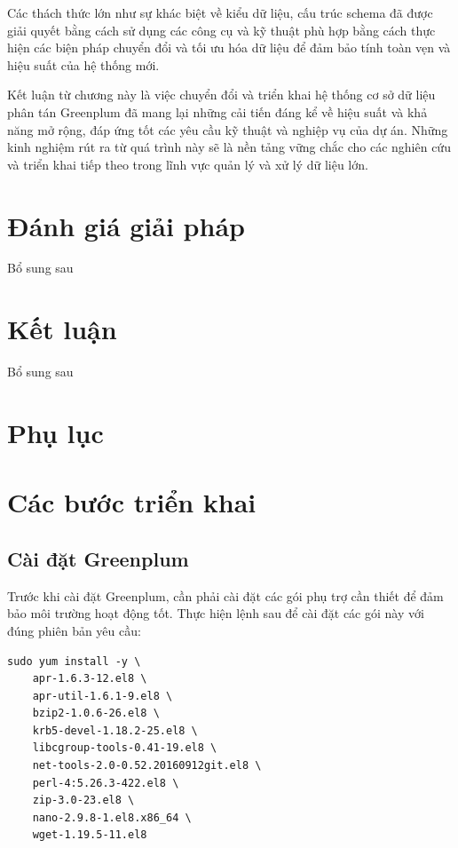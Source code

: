 \documentclass[14pt]{article}
\begin{document}
Các thách thức lớn như sự khác biệt về kiểu dữ liệu, cấu trúc schema đã được giải quyết bằng cách sử dụng các công cụ và kỹ thuật phù hợp bằng cách thực hiện các biện pháp chuyển đổi và tối ưu hóa dữ liệu để đảm bảo tính toàn vẹn và hiệu suất của hệ thống mới.

Kết luận từ chương này là việc chuyển đổi và triển khai hệ thống cơ sở dữ liệu phân tán Greenplum đã mang lại những cải tiến đáng kể về hiệu suất và khả năng mở rộng, đáp ứng tốt các yêu cầu kỹ thuật và nghiệp vụ của dự án. Những kinh nghiệm rút ra từ quá trình này sẽ là nền tảng vững chắc cho các nghiên cứu và triển khai tiếp theo trong lĩnh vực quản lý và xử lý dữ liệu lớn.





\section{Đánh giá giải pháp}
Bổ sung sau

\section{Kết luận}
Bổ sung sau

\section{Phụ lục}
\appendix

\section{Các bước triển khai}




\subsection{Cài đặt Greenplum}

Trước khi cài đặt Greenplum, cần phải cài đặt các gói phụ trợ cần thiết để đảm bảo môi trường hoạt động tốt. Thực hiện lệnh sau để cài đặt các gói này với đúng phiên bản yêu cầu:
\begin{verbatim}
sudo yum install -y \
    apr-1.6.3-12.el8 \
    apr-util-1.6.1-9.el8 \
    bzip2-1.0.6-26.el8 \
    krb5-devel-1.18.2-25.el8 \
    libcgroup-tools-0.41-19.el8 \
    net-tools-2.0-0.52.20160912git.el8 \
    perl-4:5.26.3-422.el8 \
    zip-3.0-23.el8 \
    nano-2.9.8-1.el8.x86_64 \
    wget-1.19.5-11.el8
\end{verbatim}
\end{document}
